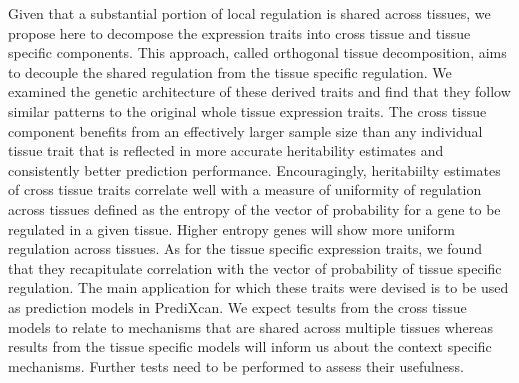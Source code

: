 \documentclass[10pt,letterpaper]{article}
\begin{document}
Given that a substantial portion of local regulation is shared across tissues, we propose here to decompose the expression traits into cross tissue and tissue specific components. This approach, called orthogonal tissue decomposition, aims to decouple the shared regulation from the tissue specific regulation. We examined the genetic architecture of these derived traits and find that they follow similar patterns to the original whole tissue expression traits. The cross tissue component benefits from an effectively larger sample size than any individual tissue trait that is reflected in more accurate heritability estimates and consistently better prediction performance. Encouragingly, heritabiilty estimates of cross tissue traits correlate well with a measure of uniformity of regulation across tissues defined as the entropy of the vector of probability for a gene to be regulated in a given tissue. Higher entropy genes will show more uniform regulation across tissues. As for the tissue specific expression traits, we found that they recapitulate correlation with the vector of probability of tissue specific regulation. The main application for which these traits were devised is to be used as prediction models in PrediXcan. We expect tesults from the cross tissue models to relate to mechanisms that are shared across multiple tissues whereas results from the tissue specific models will inform us about the context specific mechanisms. Further tests need to be performed to assess their usefulness.

\end{document}
